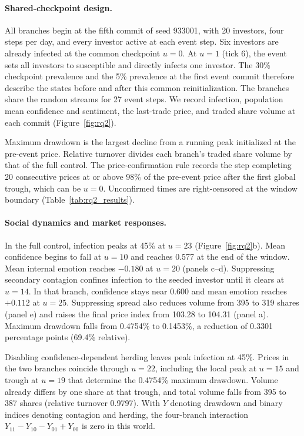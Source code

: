 \paragraph{Shared-checkpoint design.}
All branches begin at the fifth commit of seed 933001, with 20 investors, four steps per day, and every investor active at each event step. Six investors are already infected at the common checkpoint $u=0$. At $u=1$ (tick 6), the event sets all investors to susceptible and directly infects one investor. The 30\% checkpoint prevalence and the 5\% prevalence at the first event commit therefore describe the states before and after this common reinitialization. The branches share the random streams for 27 event steps. We record infection, population mean confidence and sentiment, the last-trade price, and traded share volume at each commit (Figure~\ref{fig:rq2}).

Maximum drawdown is the largest decline from a running peak initialized at the pre-event price. Relative turnover divides each branch's traded share volume by that of the full control. The price-confirmation rule records the step completing 20 consecutive prices at or above 98\% of the pre-event price after the first global trough, which can be $u=0$. Unconfirmed times are right-censored at the window boundary (Table~\ref{tab:rq2_results}).

\paragraph{Social dynamics and market responses.}
In the full control, infection peaks at 45\% at $u=23$ (Figure~\ref{fig:rq2}b). Mean confidence begins to fall at $u=10$ and reaches 0.577 at the end of the window. Mean internal emotion reaches $-0.180$ at $u=20$ (panels c--d). Suppressing secondary contagion confines infection to the seeded investor until it clears at $u=14$. In that branch, confidence stays near 0.600 and mean emotion reaches $+0.112$ at $u=25$. Suppressing spread also reduces volume from 395 to 319 shares (panel e) and raises the final price index from 103.28 to 104.31 (panel a). Maximum drawdown falls from 0.4754\% to 0.1453\%, a reduction of 0.3301 percentage points (69.4\% relative).

Disabling confidence-dependent herding leaves peak infection at 45\%. Prices in the two branches coincide through $u=22$, including the local peak at $u=15$ and trough at $u=19$ that determine the 0.4754\% maximum drawdown. Volume already differs by one share at that trough, and total volume falls from 395 to 387 shares (relative turnover 0.9797). With $Y$ denoting drawdown and binary indices denoting contagion and herding, the four-branch interaction $Y_{11}-Y_{10}-Y_{01}+Y_{00}$ is zero in this world.

